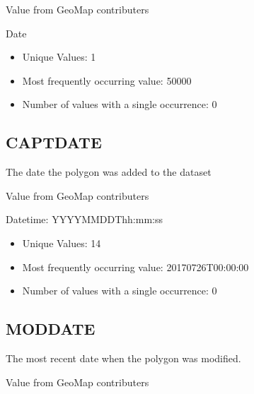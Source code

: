 \documentclass[letterpaper,10pt,english]{sphinxmanual}
\begin{document}
Value from GeoMap contributers

Date


\begin{itemize}
\item {} 
Unique Values: 1

\item {} 
Most frequently occurring value: 50000

\item {} 
Number of values with a single occurrence: 0

\end{itemize}


\subsection{CAPTDATE}
\label{\detokenize{field_glossary:captdate}}
The date the polygon was added to the dataset

Value from GeoMap contributers

Datetime: YYYY\sphinxhyphen{}MM\sphinxhyphen{}DDThh:mm:ss


\begin{itemize}
\item {} 
Unique Values: 14

\item {} 
Most frequently occurring value: 2017\sphinxhyphen{}07\sphinxhyphen{}26T00:00:00

\item {} 
Number of values with a single occurrence: 0

\end{itemize}


\subsection{MODDATE}
\label{\detokenize{field_glossary:moddate}}
The most recent date when the polygon was modified.

Value from GeoMap contributers
\end{document}
